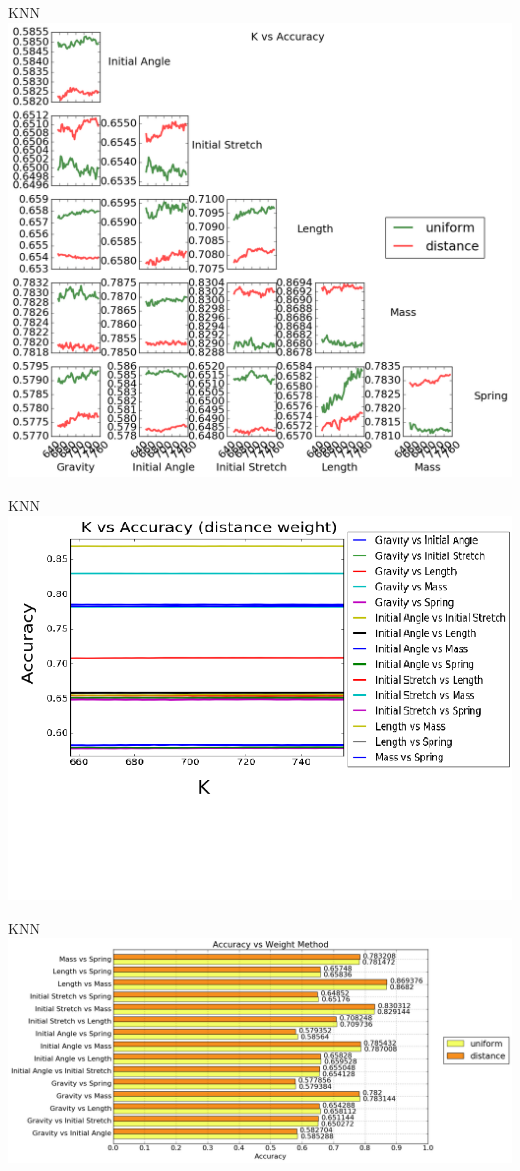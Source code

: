 \documentclass{beamer}
\begin{document}
\begin{frame}{KNN}
\centering
\includegraphics[scale=0.27]{images/KvsAccuracy_gridspec.png}
\end{frame}

\begin{frame}{KNN}
\centering
\vspace{30 pt}
\includegraphics[scale=0.5]{images/edited_weight.png}
\end{frame}


\begin{frame}{KNN}
\centering
\includegraphics[scale=0.3]{images/AccuracyVsWeight_plot1.png}
\end{frame}
\end{document}
